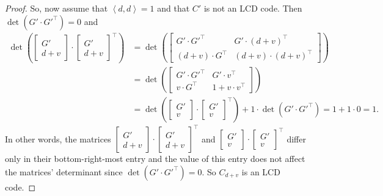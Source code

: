 \documentclass[10pt,a4paper]{amsart}
\newcommand{\Ang}[1]{\left\langle#1\right\rangle}
\begin{document}
\begin{proof}
	So, now assume that $\Ang{d, d} = 1$ and that $C'$ is not an LCD code.
	Then $\det(G' \cdot G'^\top) = 0$ and
	\begin{align*}
		\det \left( \begin{bmatrix}
			G' \\
			d + v
		\end{bmatrix} \cdot {\begin{bmatrix}
			G' \\
			d + v
		\end{bmatrix}}^\top \right)
		&= \det \left( \begin{bmatrix}
			G' \cdot G'^\top & G' \cdot {(d + v)}^\top \\
			(d + v) \cdot G^\top & (d + v) \cdot {(d + v)}^\top
		\end{bmatrix} \right) \\
		&= \det \left( \begin{bmatrix}
			G' \cdot G'^\top & G' \cdot v^\top \\
			v \cdot G^\top & 1 + v \cdot v^\top
		\end{bmatrix} \right) \\
		&= \det \left( \begin{bmatrix}
			G' \\
			v
		\end{bmatrix} \cdot {\begin{bmatrix}
			G' \\
			v
		\end{bmatrix}}^\top \right) + 1 \cdot \det \left( G' \cdot G'^\top \right)
		= 1 + 1 \cdot 0
		= 1.
	\end{align*}
	In other words, the matrices $\begin{bmatrix} G' \\ d + v \end{bmatrix} \cdot {\begin{bmatrix} G' \\ d + v \end{bmatrix}}^\top$ and $\begin{bmatrix} G' \\ v \end{bmatrix} \cdot {\begin{bmatrix} G' \\ v \end{bmatrix}}^\top$ differ only in their bottom-right-most entry and the value of this entry does not affect the matrices' determinant since $\det(G' \cdot G'^\top) = 0$.
	So $C_{d + v}$ is an LCD code.
\end{proof}
\end{document}

